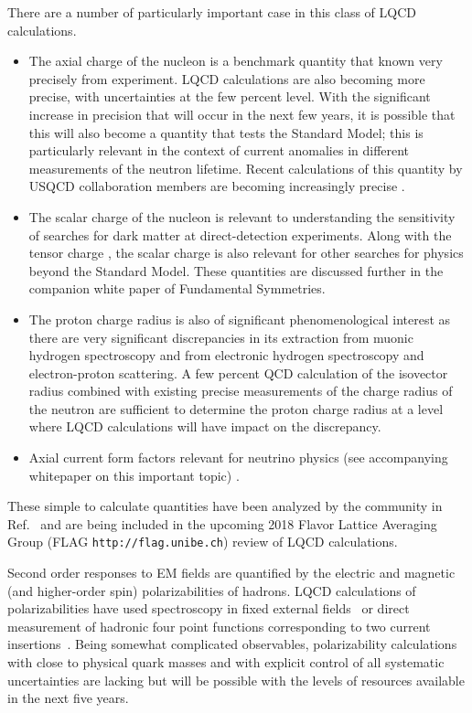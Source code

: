 There are a number of particularly important case in this class of LQCD calculations. 
\begin{itemize}
	\item The axial charge of the nucleon is a benchmark quantity that known very precisely from experiment. LQCD calculations are also becoming more precise, with uncertainties at the few percent level. With the significant increase in precision that will occur in the next few years, it is possible that this will also become a quantity that tests the Standard Model; this is particularly relevant in the context of current anomalies in different measurements of the neutron lifetime. Recent calculations of this quantity by USQCD collaboration members are becoming increasingly precise \cite{Bhattacharya:2016zcn,Yoon:2016jzj,Chang:2018uxx,Gupta:2018qil} .
	\item The scalar charge of the nucleon is relevant to understanding the sensitivity of searches for dark matter at direct-detection experiments. Along with the tensor charge \cite{Gupta:2018lvp}, the scalar charge is also relevant for other searches for physics beyond the Standard Model. These quantities are discussed further in the companion white paper of Fundamental Symmetries.
	\item The proton charge radius is also of significant phenomenological interest as there are very significant discrepancies in its extraction from muonic hydrogen spectroscopy  and from electronic hydrogen spectroscopy and electron-proton scattering. A few percent QCD calculation of the isovector radius combined with existing precise measurements of the charge radius of the neutron are sufficient to determine the proton charge radius at a level where  LQCD calculations will  have impact on the discrepancy.
	\item Axial current form factors relevant for neutrino physics (see accompanying whitepaper on this important topic) \cite{Rajan:2017lxk}.
\end{itemize} 
These simple to calculate quantities have been analyzed by the community in Ref.~\cite{Lin:2017snn} and  are being included in the upcoming 2018 Flavor Lattice Averaging Group (FLAG {\tt http://flag.unibe.ch})
review of LQCD calculations.

Second order responses to EM fields are quantified by the electric and magnetic (and higher-order spin) polarizabilities of hadrons. LQCD calculations of polarizabilities have used spectroscopy in fixed external fields~\cite{Savage:2016kon,Shanahan:2017bgi,Tiburzi:2017iux} or direct measurement of hadronic four point functions corresponding to two current insertions~\cite{Engelhardt:2007ub}. Being somewhat complicated observables, polarizability calculations with close to physical quark masses and with explicit control of all systematic uncertainties are lacking but will be possible with the levels of resources available in the next five years.

